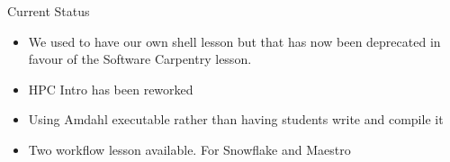 \begin{frame}{Current Status}
	\begin{itemize}
		\item We used to have our own shell lesson but that has now been deprecated in favour of the Software Carpentry lesson.
		\item HPC Intro has been reworked
		\item Using Amdahl executable rather than having students write and compile it
		\item Two workflow lesson available. For Snowflake and Maestro
	\end{itemize}
\note{}
\end{frame}